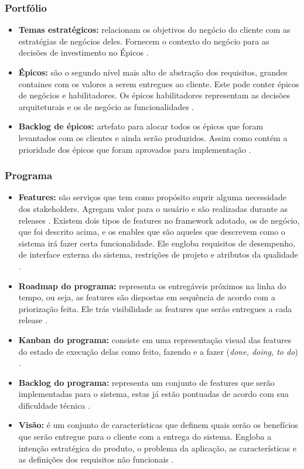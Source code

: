 \subsubsection{Portfólio}
\begin{itemize}
    \item \textbf{Temas estratégicos:} relacionam os objetivos do negócio do cliente com as estratégias de negócios deles. Fornecem o contexto do negócio para as decisões de investimento no Épicos \cite{safe}.
    \item \textbf{Épicos:} são o segundo nível mais alto de abstração dos requisitos, grandes containes com os valores a serem entregues ao cliente. Este pode conter épicos de negócios e habilitadores. Os épicos habilitadores representam as decisões arquiteturais e os de negócio as funcionalidades \cite{safe}.
    \item \textbf{Backlog de épicos:} artefato para alocar todos os épicos que foram levantados com os clientes e ainda serão produzidos. Assim como contém a prioridade dos épicos que foram aprovados para implementação \cite{safe}.
\end{itemize}

\subsubsection{Programa}
\begin{itemize}
    \item \textbf{Features:} são serviços que tem como propósito suprir alguma necessidade dos stakeholders. Agregam valor para o usuário e são realizadas durante as releases \cite{leffingwell2011}. Existem dois tipos de features no framework adotado, os de negócio, que foi descrito acima, e os enables que são aqueles que descrevem como o sistema irá fazer certa funcionalidade. Ele engloba requisitos de desempenho, de interface externa do sistema, restrições de projeto e atributos da qualidade \cite{safe}.
    \item \textbf{Roadmap do programa:} representa os entregáveis próximos na linha do tempo, ou seja, as features são dispostas em sequência de acordo com a priorização feita. Ele trás visibilidade as features que serão entregues a cada release \cite{safe}.
    \item \textbf{Kanban do programa:} consiste em uma representação visual das features do estado de execução delas como feito, fazendo e a fazer (\textit{done, doing, to do}) \cite{leffingwell2011}.
    \item \textbf{Backlog do programa:} representa um conjunto de features que serão implementadas para o sistema, estas já estão pontuadas de acordo com sua dificuldade técnica \cite{safe}.
    \item \textbf{Visão:} é um conjunto de características que definem quais serão os benefícios que serão entregue para o cliente com a entrega do sistema. Engloba a intenção estratégica do produto, o problema da aplicação, as características e as definições dos requisitos não funcionais \cite{leffingwell2011}. 
\end{itemize}
